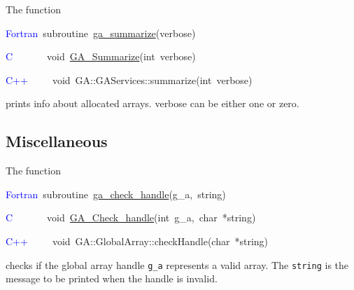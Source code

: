 The function

\textcolor{blue}{Fortran}~subroutine~\href{https://hpc.pnl.gov/globalarrays/api/f_op_api.html\#ga_summarize}{ga\_{}summarize}(verbose)~

\textcolor{blue}{C~}~~~~~~void~\href{https://hpc.pnl.gov/globalarrays/api/c_op_api.html\#ga_summarize}{GA\_{}Summarize}(int~verbose)~

\textcolor{blue}{C++}~~~~~void~GA::GAServices::summarize(int~verbose)

prints info about allocated arrays. verbose can be either one or zero. 


\subsection{Miscellaneous }

The function

\textcolor{blue}{Fortran}~subroutine~\href{https://hpc.pnl.gov/globalarrays/api/f_op_api.html\#ga_check_handle}{ga\_{}check\_{}handle}(g\_a,~string)~

\textcolor{blue}{C~~}~~~~~void~\href{https://hpc.pnl.gov/globalarrays/api/c_op_api.html\#ga_check_handle}{GA\_{}Check\_{}handle}(int~g\_a,~char~{*}string)

\textcolor{blue}{C++}~~~~~void~GA::GlobalArray::checkHandle(char~{*}string)

checks if the global array handle \texttt{g\_a} represents a valid
array. The \texttt{string} is the message to be printed when the handle
is invalid.
